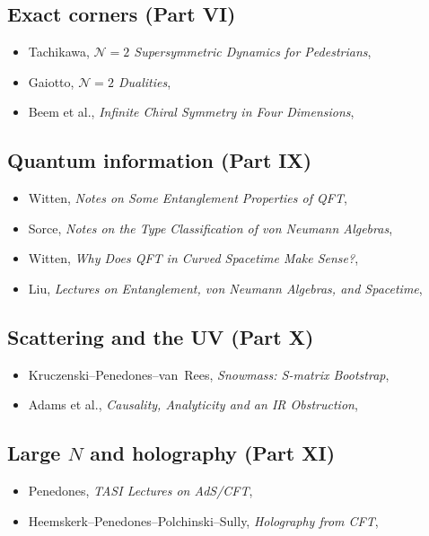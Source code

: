 \subsection*{Exact corners (Part VI)}
\begin{itemize}
\item[$\bullet$] Tachikawa, \emph{$\mathcal{N}=2$ Supersymmetric Dynamics for Pedestrians}, 
\item[$\circ$] Gaiotto, \emph{$\mathcal{N}=2$ Dualities}, 
\item[$\circ$] Beem et al., \emph{Infinite Chiral Symmetry in Four Dimensions}, 
\end{itemize}

\subsection*{Quantum information (Part IX)}
\begin{itemize}
\item[$\bullet$] Witten, \emph{Notes on Some Entanglement Properties of QFT}, 
\item[$\bullet$] Sorce, \emph{Notes on the Type Classification of von Neumann Algebras}, 
\item[$\circ$] Witten, \emph{Why Does QFT in Curved Spacetime Make Sense?}, 
\item[$\bullet$] Liu, \emph{Lectures on Entanglement, von Neumann Algebras, and Spacetime}, 
\end{itemize}

\subsection*{Scattering and the UV (Part X)}
\begin{itemize}
\item[$\bullet$] Kruczenski--Penedones--van~Rees, \emph{Snowmass: S-matrix Bootstrap}, 
\item[$\circ$] Adams et al., \emph{Causality, Analyticity and an IR Obstruction}, 
\end{itemize}

\subsection*{Large $N$ and holography (Part XI)}
\begin{itemize}
\item[$\bullet$] Penedones, \emph{TASI Lectures on AdS/CFT}, 
\item[$\circ$] Heemskerk--Penedones--Polchinski--Sully, \emph{Holography from CFT}, 
\end{itemize}

